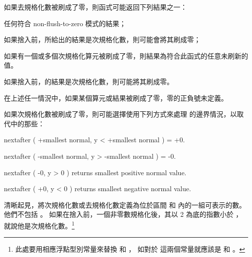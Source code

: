 如果去規格化數被刷成了零，則函式可能返回下列結果之一：
\startigNum
\item[item:nftz]任何符合 non-flush-to-zero 模式的結果；

\item 如果捨入前，所給出的結果是次規格化數，則可能會將其刷成零；

\item[item:nfcr] 如果有一個或多個次規格化算元被刷成了零，則結果為符合此函式的任意未刷新的值。

\item 如果捨入前，的結果是次規格化數，則可能將其刷成零。
\stopigNum

在上述任一情況中，如果某個算元或結果被刷成了零，零的正負號未定義。

如果次規格化數被刷成了零，則可能選擇使用下列方式來處理 
的邊界情況，以取代中的那些：

nextafter ( +smallest normal, y < +smallest normal ) = +0.\par
nextafter ( -smallest normal, y > -smallest normal ) = -0.\par
nextafter ( -0, y > 0 ) returns smallest positive normal value.\par
nextafter ( +0, y < 0 ) returns smallest negative normal value.\par

清晰起見，將次規格化數或去規格化數定義為位於區間 
和  內的一組可表示的數。
他們不包括 。
如果在捨入前，一個非零數規格化後，其以 2 為底的指數小於 ，
就說他是次規格化數。\footnote{%
此處要用相應浮點型別常量來替換  和 ，
如對於  這兩個常量就應該是  和 。}